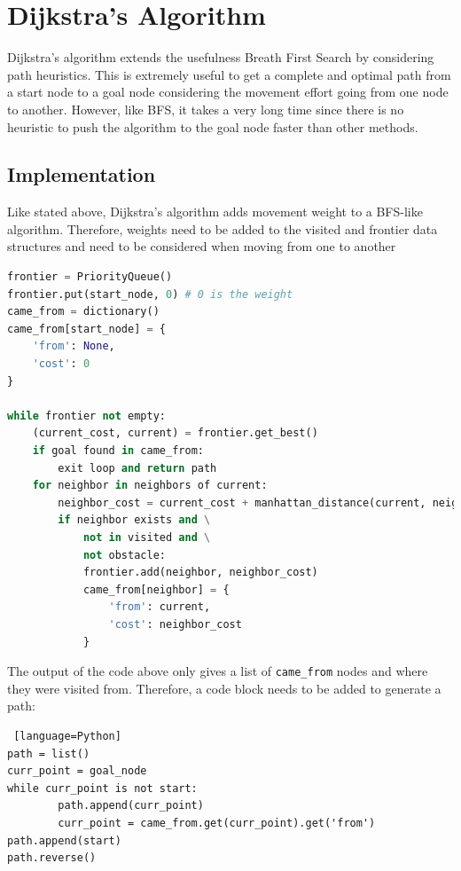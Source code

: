 \documentclass[journal]{IEEEtran}
\begin{document}
    \newpage

    \section{Dijkstra's Algorithm} \label{Dijkstra}
    Dijkstra's algorithm extends the usefulness Breath First Search by considering path heuristics. This is extremely useful to get a complete and optimal path from a start node to a goal node considering the movement effort going from one node to another. However, like BFS, it takes a very long time since there is no heuristic to push the algorithm to the goal node faster than other methods.

    \subsection{Implementation}
    Like stated above, Dijkstra's algorithm adds movement weight to a BFS-like algorithm. Therefore, weights need to be added to the visited and frontier data structures and need to be considered when moving from one to another

    \begin{lstlisting}[language=Python]
frontier = PriorityQueue()
frontier.put(start_node, 0) # 0 is the weight
came_from = dictionary()
came_from[start_node] = {
    'from': None,
    'cost': 0
}

while frontier not empty:
    (current_cost, current) = frontier.get_best()
    if goal found in came_from:
        exit loop and return path
    for neighbor in neighbors of current:
        neighbor_cost = current_cost + manhattan_distance(current, neighbor)
        if neighbor exists and \
            not in visited and \
            not obstacle:
            frontier.add(neighbor, neighbor_cost)
            came_from[neighbor] = {
                'from': current,
                'cost': neighbor_cost
            }
    \end{lstlisting}
        
    The output of the code above only gives a list of \lstinline{came_from} nodes and where they were visited from. Therefore, a code block needs to be added to generate a path:

    \begin{lstlisting} [language=Python]
path = list()
curr_point = goal_node
while curr_point is not start:
        path.append(curr_point)
        curr_point = came_from.get(curr_point).get('from')
path.append(start)
path.reverse()
    \end{lstlisting}
\end{document}
